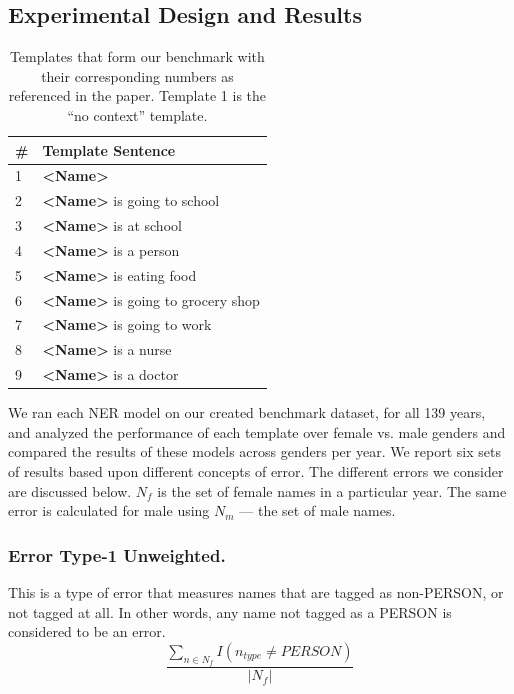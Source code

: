 \subsection{Experimental Design and Results}
\begin{table}
\centering
\begin{tabular}{ p{1cm}p{5.0cm}}
 \toprule
\#&Template Sentence\\
 \midrule
 1&\textbf{\textless Name\textgreater}\\[0.5pt]
 2&\textbf{\textless Name\textgreater} is going to school\\[0.5pt]
 3&\textbf{\textless Name\textgreater} is at school\\[0.5pt]
 4&\textbf{\textless Name\textgreater} is a person\\[0.5pt]
 5&\textbf{\textless Name\textgreater} is eating food\\[0.5pt]
 6&\textbf{\textless Name\textgreater} is going to grocery shop\\[0.5pt]
 7&\textbf{\textless Name\textgreater} is going to work\\[0.5pt]
 8&\textbf{\textless Name\textgreater} is a nurse\\[0.5pt]
 9&\textbf{\textless Name\textgreater} is a doctor\\[0.5pt]
 \bottomrule
\end{tabular}
\caption{Templates that form our benchmark with their corresponding numbers as referenced in the paper. Template 1 is the ``no context'' template.}
\label{Templates}
\end{table}
We ran each NER model on our created benchmark dataset, for all 139 years, and analyzed the performance of each template over female vs. male genders and compared the results of these models across genders per year. We report six sets of results based upon different concepts of error. The different errors we consider are discussed below. $N_f$ is the set of female names in a particular year. The same error is calculated for male using $N_m$ --- the set of male names.

\subsubsection{Error Type-1 Unweighted.} 
This is a type of error that measures names that are tagged as non-PERSON, or not tagged at all. In other words, any name not tagged as a PERSON is considered to be an error.
\[ \frac{\sum_{n \in N_f}I(n_{type} \neq PERSON)}{|N_f|}\]

